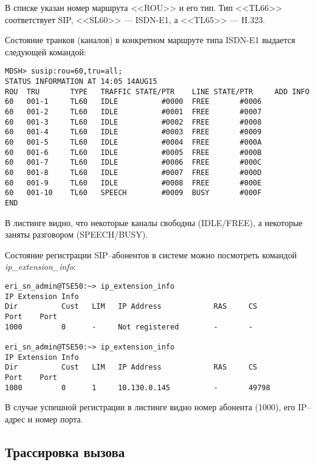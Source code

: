 В списке указан номер маршрута <<ROU>> и его тип. Тип <<TL66>> соответствует SIP, <<SL60>> --- ISDN-E1, а <<TL65>> --- H.323.

Состояние транков (каналов) в конкретном маршруте типа ISDN-E1 выдается следующей командой:
\begin{lstlisting}
MDSH> susip:rou=60,tru=all;
STATUS INFORMATION AT 14:05 14AUG15
ROU  TRU       TYPE   TRAFFIC STATE/PTR    LINE STATE/PTR     ADD INFO
60   001-1     TL60   IDLE          #0000  FREE       #0006
60   001-2     TL60   IDLE          #0001  FREE       #0007
60   001-3     TL60   IDLE          #0002  FREE       #0008
60   001-4     TL60   IDLE          #0003  FREE       #0009
60   001-5     TL60   IDLE          #0004  FREE       #000A
60   001-6     TL60   IDLE          #0005  FREE       #000B
60   001-7     TL60   IDLE          #0006  FREE       #000C
60   001-8     TL60   IDLE          #0007  FREE       #000D
60   001-9     TL60   IDLE          #0008  FREE       #000E
60   001-10    TL60   SPEECH        #0009  BUSY       #000F
END
\end{lstlisting}

В листинге видно, что некоторые каналы свободны (IDLE/FREE), а некоторые заняты разговором (SPEECH/BUSY). 

Состояние регистрации SIP--абонентов в системе можно посмотреть командой {\em ip\_extension\_info}:
\begin{lstlisting}
eri_sn_admin@TSE50:~> ip_extension_info
IP Extension Info
Dir          Cust   LIM   IP Address            RAS     CS
Port    Port
1000         0      -     Not registered        -       -

eri_sn_admin@TSE50:~> ip_extension_info
IP Extension Info
Dir          Cust   LIM   IP Address            RAS     CS
Port    Port
1000         0      1     10.130.0.145          -       49798
\end{lstlisting}

В случае успешной регистрации в листинге видно номер абонента (1000), его IP--адрес и номер порта.

\subsection{Трассировка вызова} \label{subsec:trace}

